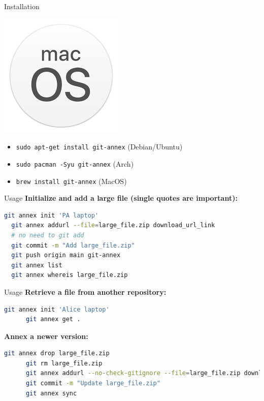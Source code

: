 \begin{frame}{Installation}
\begin{center}
\begin{minipage}{0.2\textwidth}
    \end{minipage}%
    \begin{minipage}{0.2\textwidth}
      \centering
      \includegraphics[width=0.5\linewidth]{images/macOS-logo.png}
    \end{minipage}
  \end{center}

  \vspace{0.5cm}

  \begin{itemize}
    \item \texttt{sudo apt-get install git-annex} (Debian/Ubuntu)
    \item \texttt{sudo pacman -Syu git-annex} (Arch)
    \item \texttt{brew install git-annex} (MacOS)
  \end{itemize}
\end{frame}

\begin{frame}[fragile]{Usage}
  \textbf{Initialize and add a large file (single quotes are important):}
  \begin{lstlisting}[language=bash]
  git annex init 'PA laptop'
  git annex addurl --file=large_file.zip download_url_link
  # no need to git add
  git commit -m "Add large_file.zip"
  git push origin main git-annex
  git annex list
  git annex whereis large_file.zip
\end{lstlisting}
\end{frame}

\begin{frame}[fragile]{Usage}
  \textbf{Retrieve a file from another repository:}
  \begin{lstlisting}[language=bash]
      git annex init 'Alice laptop'
      git annex get .
    \end{lstlisting}
  \textbf{Annex a newer version:}
    \begin{lstlisting}[language=bash]
      git annex drop large_file.zip
      git rm large_file.zip
      git annex addurl --no-check-gitignore --file=large_file.zip download_url_link
      git commit -m "Update large_file.zip"
      git annex sync
  \end{lstlisting}
\end{frame}

